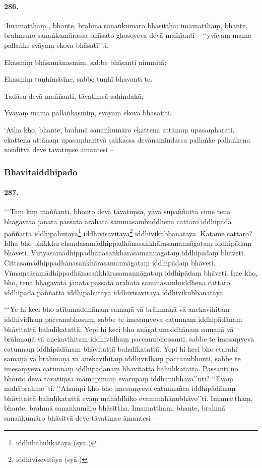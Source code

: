 \paragraph{286.} ‘Imamatthaṃ , bhante, brahmā sanaṅkumāro bhāsittha; imamatthaṃ, bhante, brahmuno sanaṅkumārassa bhāsato ghosoyeva devā maññanti – ‘‘yvāyaṃ mama pallaṅke svāyaṃ ekova bhāsatī’’ti.

Ekasmiṃ bhāsamānasmiṃ, sabbe bhāsanti nimmitā;

Ekasmiṃ tuṇhimāsīne, sabbe tuṇhī bhavanti te.

Tadāsu devā maññanti, tāvatiṃsā sahindakā;

Yvāyaṃ mama pallaṅkasmiṃ, svāyaṃ ekova bhāsatīti.

‘Atha kho, bhante, brahmā sanaṅkumāro ekattena attānaṃ upasaṃharati, ekattena attānaṃ upasaṃharitvā sakkassa devānamindassa pallaṅke pallaṅkena nisīditvā deve tāvatiṃse āmantesi –

\subsubsection{Bhāvitaiddhipādo}

\paragraph{287.} ‘‘‘Taṃ kiṃ maññanti, bhonto devā tāvatiṃsā, yāva supaññattā cime tena bhagavatā jānatā passatā arahatā sammāsambuddhena cattāro iddhipādā paññattā iddhipahutāya\footnote{iddhibahulīkatāya (syā.)} iddhivisavitāya\footnote{iddhivisevitāya (syā.)} iddhivikubbanatāya. Katame cattāro? Idha bho bhikkhu chandasamādhippadhānasaṅkhārasamannāgataṃ iddhipādaṃ bhāveti. Vīriyasamādhippadhānasaṅkhārasamannāgataṃ iddhipādaṃ bhāveti. Cittasamādhippadhānasaṅkhārasamannāgataṃ iddhipādaṃ bhāveti. Vīmaṃsāsamādhippadhānasaṅkhārasamannāgataṃ iddhipādaṃ bhāveti. Ime kho, bho, tena bhagavatā jānatā passatā arahatā sammāsambuddhena cattāro iddhipādā paññattā iddhipahutāya iddhivisavitāya iddhivikubbanatāya.

‘‘‘Ye hi keci bho atītamaddhānaṃ samaṇā vā brāhmaṇā vā anekavihitaṃ iddhividhaṃ paccanubhosuṃ, sabbe te imesaṃyeva catunnaṃ iddhipādānaṃ bhāvitattā bahulīkatattā. Yepi hi keci bho anāgatamaddhānaṃ samaṇā vā brāhmaṇā vā anekavihitaṃ iddhividhaṃ paccanubhossanti, sabbe te imesaṃyeva catunnaṃ iddhipādānaṃ bhāvitattā bahulīkatattā. Yepi hi keci bho etarahi samaṇā vā brāhmaṇā vā anekavihitaṃ iddhividhaṃ paccanubhonti, sabbe te imesaṃyeva catunnaṃ iddhipādānaṃ bhāvitattā bahulīkatattā. Passanti no bhonto devā tāvatiṃsā mamapimaṃ evarūpaṃ iddhānubhāva’’nti? ‘‘Evaṃ mahābrahme’’ti. ‘‘Ahampi kho bho imesaṃyeva catunnañca iddhipādānaṃ bhāvitattā bahulīkatattā evaṃ mahiddhiko evaṃmahānubhāvo’’ti. Imamatthaṃ, bhante, brahmā sanaṅkumāro bhāsittha. Imamatthaṃ, bhante, brahmā sanaṅkumāro bhāsitvā deve tāvatiṃse āmantesi –

